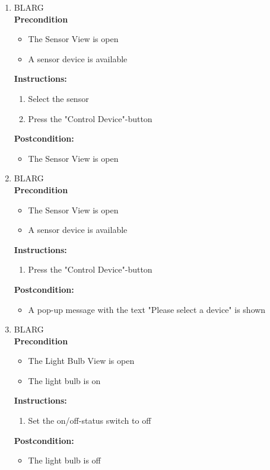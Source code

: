\documentclass[a4paper]{article}
\newlength{\testlabellength}
\newenvironment{testlist}{\begin{enumerate}[label=\bfseries Instruction \thesubsection.\arabic* , labelindent=0pt, labelwidth=\testlabellength , leftmargin=2cm]}{\end{enumerate}}
\newenvironment{precondition}{
{\color{white}BLARG}\\ 
\textbf{Precondition}
\begin{itemize}[labelindent=0cm, labelwidth=2cm , leftmargin=1cm]
}
{\end{itemize}}
\newenvironment{instruction}{
\textbf{Instructions:}
\begin{enumerate}[label=\bfseries  \arabic*., labelindent=0cm, labelwidth=2cm , leftmargin=1cm]
}
{\end{enumerate}}
\newenvironment{postcondition}{
\textbf{Postcondition:}
\begin{itemize}[labelindent=0cm, labelwidth=2cm , leftmargin=1cm]
}
{\end{itemize}}
\begin{document}
\begin{appendices}
\begin{testlist}
	\item
		\begin{precondition}
			\item The Sensor View is open
			\item A sensor device is available
		\end{precondition}
		\begin{instruction}
			\item Select the sensor
			\item Press the "Control Device"-button
		\end{instruction}
		\begin{postcondition}
			\item The Sensor View is open
		\end{postcondition}

	\item
		\begin{precondition}
			\item The Sensor View is open
			\item A sensor device is available
		\end{precondition}
		\begin{instruction}
			\item Press the "Control Device"-button
		\end{instruction}
		\begin{postcondition}
			\item A pop-up message with the text "Please select a device" is shown
		\end{postcondition}

	\item
		\begin{precondition}
			\item The Light Bulb View is open
			\item The light bulb is on
		\end{precondition}
		\begin{instruction}
			\item Set the on/off-status switch to off
		\end{instruction}
		\begin{postcondition}
			\item The light bulb is off
		\end{postcondition}


\end{testlist}
\end{appendices}
\end{document}
